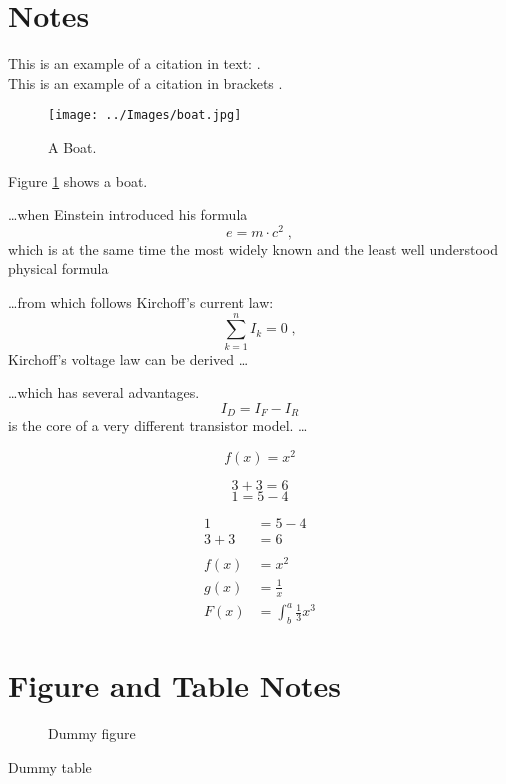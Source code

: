 

	\section{Notes}

	This is an example of a citation in text:	\cite{Reynolds:1987:FHS:37402.37406}.\\
	This is an example of a citation in brackets \citep{Reynolds:1987:FHS:37402.37406}.

	\begin{figure}
		\texttt{[image: ../Images/boat.jpg]}
		\caption{A Boat.}
		\label{fig:boat1}
	\end{figure}
	
	Figure \ref{fig:boat1} shows a boat.
		
	\ldots when Einstein introduced his formula
	\begin{equation}
		e = m \cdot c^2 \; ,
	\end{equation}
	which is at the same time the most widely known and the least
	well understood physical formula
	
	\ldots from which follows Kirchoff's current law:
	\begin{equation}
		\sum_{k=1}^{n} I_k = 0 \; ,
	\end{equation}
	Kirchoff's voltage law can be derived \ldots
	
	\ldots which has several advantages.
	\begin{equation}
		I_D = I_F - I_R
	\end{equation}
	is the core of a very different transistor model. \ldots
	
	\begin{equation}
		f(x) = x^2
	\end {equation}
	
	\begin{equation*}
		3+ 3 = 6
	\end {equation*}
	\begin{equation*}
		1 = 5 - 4
	\end {equation*}
	
	\begin{align*}
		1 &= 5 - 4\\ %
		3+ 3 &= 6\\ 
		\\
		f(x) &= x^2\\
  		g(x) &= \frac{1}{x}\\
  		F(x) &= \int^a_b \frac{1}{3}x^3
	\end {align*}

\newpage

	\section{Figure and Table Notes}

	\begin{figure}
	 	\caption{Dummy figure}
	\end{figure}
	
	\begin{table}
	 	\caption{Dummy table}
	\end{table}